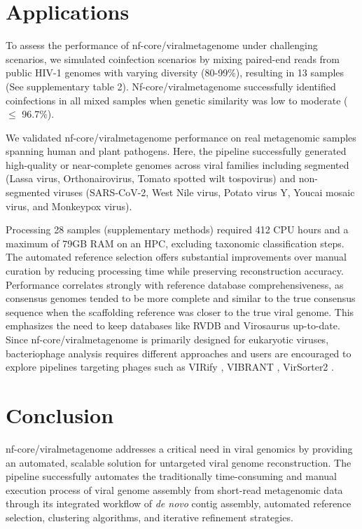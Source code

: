 \section{Applications}

To assess the performance of nf-core/viralmetagenome under challenging scenarios, we simulated coinfection scenarios by mixing paired-end reads from public HIV-1 genomes with varying diversity (80-99\%), resulting in 13 samples (See supplementary table 2). Nf-core/viralmetagenome successfully identified coinfections in all mixed samples when genetic similarity was low to moderate ($\leq$ 96.7\%).

We validated nf-core/viralmetagenome performance on real metagenomic samples spanning human and plant pathogens. Here, the pipeline successfully generated high-quality or near-complete genomes across viral families including segmented (Lassa virus, Orthonairovirus, Tomato spotted wilt tospovirus) and non-segmented viruses (SARS-CoV-2, West Nile virus, Potato virus Y, Youcai mosaic virus, and Monkeypox virus).

Processing 28 samples (supplementary methods) required 412 CPU hours and a maximum of 79GB RAM on an HPC, excluding taxonomic classification steps. The automated reference selection offers substantial improvements over manual curation by reducing processing time while preserving reconstruction accuracy. Performance correlates strongly with reference database comprehensiveness, as consensus genomes tended to be more complete and similar to the true consensus sequence when the scaffolding reference was closer to the true viral genome. This emphasizes the need to keep databases like RVDB \citep{Goodacre2018-dw} and Virosaurus \citep{Gleizes2020-rq} up-to-date. Since nf-core/viralmetagenome is primarily designed for eukaryotic viruses, bacteriophage analysis requires different approaches and users are encouraged to explore pipelines targeting phages such as VIRify \citep{Rangel-Pineros2022-wv}, VIBRANT \citep{Kieft2020-aq}, VirSorter2 \citep{Guo2021-rf}.


\section{Conclusion}

nf-core/viralmetagenome addresses a critical need in viral genomics by providing an automated, scalable solution for untargeted viral genome reconstruction. The pipeline successfully automates the traditionally time-consuming and manual execution process of viral genome assembly from short-read metagenomic data through its integrated workflow of \textit{de novo} contig assembly, automated reference selection, clustering algorithms, and iterative refinement strategies.

